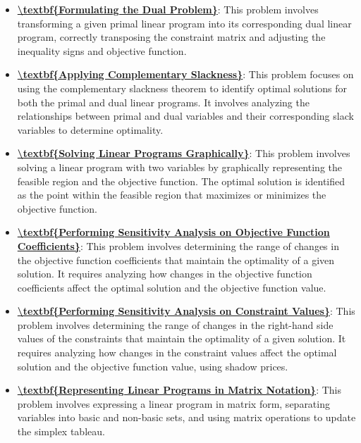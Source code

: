 \documentclass{article}%
\begin{document}
\begin{itemize}[leftmargin=*]%
\item \href{https://www.math.purdue.edu/~yipn/421/2024-12-03-Duality.pdf#page=5}{\textbf{\textbackslash{}textbf\{Formulating the Dual Problem\}}}: This problem involves transforming a given primal linear program into its corresponding dual linear program, correctly transposing the constraint matrix and adjusting the inequality signs and objective function.%
\item \href{https://www.math.purdue.edu/~yipn/421/2024-12-03-Duality.pdf#page=2}{\textbf{\textbackslash{}textbf\{Applying Complementary Slackness\}}}: This problem focuses on using the complementary slackness theorem to identify optimal solutions for both the primal and dual linear programs. It involves analyzing the relationships between primal and dual variables and their corresponding slack variables to determine optimality.%
\item \href{https://www.math.purdue.edu/~yipn/421/2024-12-03-Duality.pdf#page=3}{\textbf{\textbackslash{}textbf\{Solving Linear Programs Graphically\}}}: This problem involves solving a linear program with two variables by graphically representing the feasible region and the objective function. The optimal solution is identified as the point within the feasible region that maximizes or minimizes the objective function.%
\item \href{https://www.math.purdue.edu/~yipn/421/2024-12-03-Duality.pdf#page=14}{\textbf{\textbackslash{}textbf\{Performing Sensitivity Analysis on Objective Function Coefficients\}}}: This problem involves determining the range of changes in the objective function coefficients that maintain the optimality of a given solution. It requires analyzing how changes in the objective function coefficients affect the optimal solution and the objective function value.%
\item \href{https://www.math.purdue.edu/~yipn/421/2024-12-03-Duality.pdf#page=11}{\textbf{\textbackslash{}textbf\{Performing Sensitivity Analysis on Constraint Values\}}}: This problem involves determining the range of changes in the right-hand side values of the constraints that maintain the optimality of a given solution. It requires analyzing how changes in the constraint values affect the optimal solution and the objective function value, using shadow prices.%
\item \href{https://www.math.purdue.edu/~yipn/421/2024-12-03-Duality.pdf#page=22}{\textbf{\textbackslash{}textbf\{Representing Linear Programs in Matrix Notation\}}}: This problem involves expressing a linear program in matrix form, separating variables into basic and non-basic sets, and using matrix operations to update the simplex tableau.%
\end{itemize}
\end{document}
